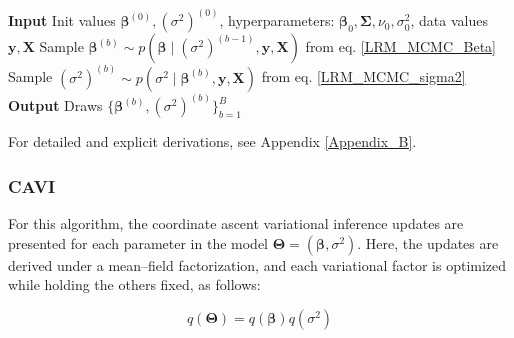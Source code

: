 \begin{algorithm}[H]
\caption{Gibbs Sampling for LRM}
\begin{algorithmic}
\State \textbf{Input} Init values $\bm{\beta}^{(0)}, (\sigma^2)^{(0)}$, hyperparameters: $\bm{\beta}_0,\bm{\Sigma},\nu_0,\sigma_0^2$, data values $\bm{y},\bm{X}$
    \State Sample $\bm{\beta}^{(b)} \sim p\left(\bm{\beta} \mid (\sigma^2)^{(b-1)},\bm{y},\bm{X}\right)$ from eq. \ref{LRM_MCMC_Beta}
    \State Sample $(\sigma^2)^{(b)} \sim p\left(\sigma^{2} \mid \bm{\beta}^{(b)},\bm{y},\bm{X}\right)$ from eq. \ref{LRM_MCMC_sigma2}
\EndFor
\State \textbf{Output} Draws $\{\bm{\beta}^{(b)}, (\sigma^2)^{(b)}\}_{b=1}^{B}$ 
\end{algorithmic}
\end{algorithm}

For detailed and explicit derivations, see Appendix \ref{Appendix_B}.


\subsubsection{CAVI}

For this algorithm, the coordinate ascent variational inference updates are presented for each parameter in the model $\bm{\Theta} = (\bm{\beta}, \sigma^2)$. Here, the updates are derived under a mean–field factorization, and each variational factor is optimized while holding the others fixed, as follows:

\begin{equation}
\label{Q_LRM}
q\left(\bm{\Theta}\right)=q(\bm{\beta})q(\sigma^2)
\end{equation}
    

